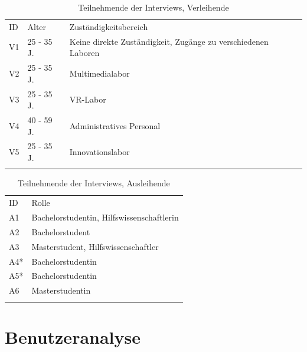 \begin{table}[h]
    \centering
    \caption{Teilnehmende der Interviews, Verleihende}
    \begin{tabular}{lll}
        \arrayrulecolor{maincolor}\hline
        \sffamily\color{maincolor}ID & \sffamily\color{maincolor}Alter &
        \sffamily\color{maincolor}Zuständigkeitsbereich \\
        \arrayrulecolor{maincolor}\hline
            V1 & 25 - 35 J. & Keine direkte Zuständigkeit, Zugänge zu verschiedenen Laboren\\
            V2 & 25 - 35 J. & Multimedialabor\\
            V3 & 25 - 35 J. & VR-Labor\\
            V4 & 40 - 59 J. & Administratives Personal\\
            V5 & 25 - 35 J. & Innovationslabor\\
            \arrayrulecolor{maincolor}\hline
    \end{tabular}  
    \label{table:v}
\end{table}

\begin{table}[h]
    \centering 
    \caption{Teilnehmende der Interviews, Ausleihende}
    \begin{tabular}{ll}
        \arrayrulecolor{maincolor}\hline
        \sffamily\color{maincolor}ID & \sffamily\color{maincolor}Rolle \\
        \arrayrulecolor{maincolor}\hline
            A1  & Bachelorstudentin, Hilfswissenschaftlerin\\
            A2 &  Bachelorstudent\\
            A3  & Masterstudent, Hilfswissenschaftler \\
            A4*  & Bachelorstudentin \\
            A5*  & Bachelorstudentin \\
            A6  & Masterstudentin \\
        \arrayrulecolor{maincolor}\hline
    \end{tabular}
    \label{table:a}
\end{table}

\section{Benutzeranalyse}
\label{section:benutzer}

